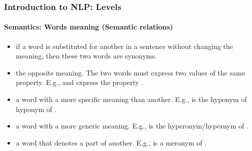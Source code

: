 \documentclass[xcolor=table]{beamer}
\begin{document}
\begin{frame}
\frametitle{Introduction to NLP: Levels}
\framesubtitle{Semantics: Words meaning (Semantic relations)}

\begin{itemize}
	\item {} if a word is substituted for another in a sentence without changing the meaning, then these two words are synonyms.
	\item {} the opposite meaning. The two words must express two values of the same property. E.g.,  and  express the property .
	
	\item {} a word with a more specific meaning than another.
	E.g.,  is the hyponym of  hyponym of .
	 
	\item {} a word with a more generic meaning.
	E.g.,  is the hyperonym/hypernym of .
	
	\item {} a word that denotes a part of another.
	E.g.,  is a meronym of .
\end{itemize}

\end{frame}
\end{document}
